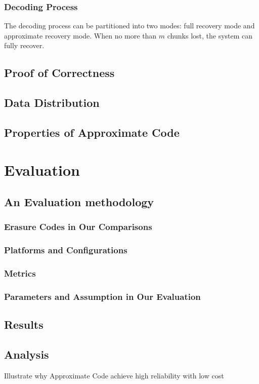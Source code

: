 \documentclass[sigconf]{acmart}
\begin{document}
\subsubsection{Decoding Process}
The decoding process can be partitioned into two modes: full recovery mode and approximate recovery mode. When no more than $m$ chunks lost, the system can fully recover.



\subsection{Proof of Correctness}
\subsection{Data Distribution}\label{Data Distribution}
\subsection{Properties of Approximate Code}

\section{Evaluation}\label{evaluation}
\subsection{An Evaluation methodology}
\subsubsection{Erasure Codes in Our Comparisons}
\subsubsection{Platforms and Configurations}
\subsubsection{Metrics}
\subsubsection{Parameters and Assumption in Our Evaluation}


\subsection{Results}
\subsection{Analysis}
Illustrate why Approximate Code achieve high reliability with low cost
\end{document}
